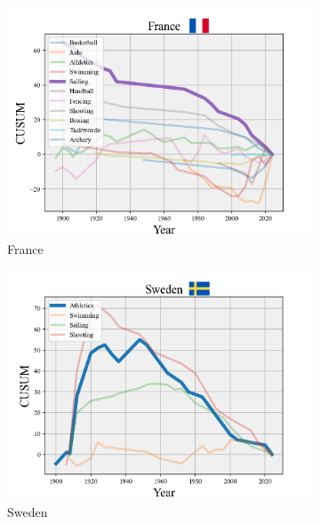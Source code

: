 \documentclass[12pt]{article}  %
\begin{document}
\begin{figure}[htbp]
	\centering
	\begin{subfigure}[b]{.32\textwidth}
		\includegraphics[width=\textwidth]{img/Decline1.png}
		\caption{France}\label{subfig:1}
	\end{subfigure}
	\hfill 
	\begin{subfigure}[b]{.32\textwidth}
		\includegraphics[width=\textwidth]{img/Decline2.png}
		\caption{Sweden}\label{subfig:2}
	\end{subfigure}
	\hfill 
	\begin{subfigure}[b]{.32\textwidth}

\end{subfigure}
\end{figure}
\end{document}
